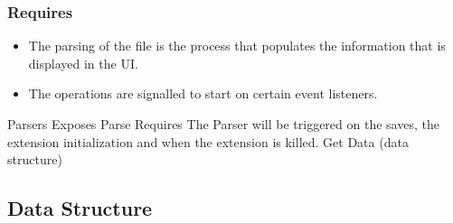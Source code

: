 \documentclass[letterpaper,10pt,titlepage,draftclsnofoot,onecolumn,onesided] {IEEEtran}
\begin{document}
		\subsubsection{Requires}
			\begin{itemize}
			\item The parsing of the file is the process that populates the information that is displayed in the UI.
			\item The operations are signalled to start on certain event listeners.
			\end{itemize}
			
	Parsers
		Exposes
			Parse 
		Requires
			The Parser will be triggered on the saves, the extension initialization and when the extension is killed.
			Get Data (data structure)
	
	\subsection{Data Structure}
\end{document}
